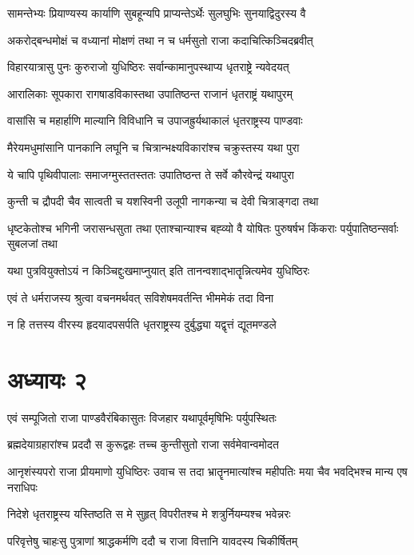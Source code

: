 \twolineshloka
{सामन्तेभ्यः प्रियाण्यस्य कार्याणि सुबहून्यपि}
{प्राप्यन्तेऽर्थेः सुलघुभिः सुनयाद्विदुरस्य वै}


\twolineshloka
{अकरोद्बन्धमोक्षं च वध्यानां मोक्षणं तथा}
{न च धर्मसुतो राजा कदाचित्किञ्चिदब्रवीत्}


\twolineshloka
{विहारयात्रासु पुनः कुरुराजो युधिष्ठिरः}
{सर्वान्कामानुपस्थाप्य धृतराष्ट्रे न्यवेदयत्}


\twolineshloka
{आरालिकाः सूपकारा रागषाडविकास्तथा}
{उपातिष्ठन्त राजानं धृतराष्ट्रं यथापुरम्}


\twolineshloka
{वासांसि च महार्हाणि माल्यानि विविधानि च}
{उपाजह्रुर्यथाकालं धृतराष्ट्रस्य पाण्डवाः}


\twolineshloka
{मैरेयमधुमांसानि पानकानि लघूनि च}
{चित्रान्भक्ष्यविकारांश्च चक्रुस्तस्य यथा पुरा}


\twolineshloka
{ये चापि पृथिवीपालाः समाजग्मुस्ततस्ततः}
{उपातिष्ठन्त ते सर्वे कौरवेन्द्रं यथापुरा}


\twolineshloka
{कुन्ती च द्रौपदी चैव सात्वती च यशस्विनी}
{उलूपी नागकन्या च देवी चित्राङ्गदा तथा}


\threelineshloka
{धृष्टकेतोश्च भगिनी जरासन्धसुता तथा}
{एताश्चान्याश्च बह्व्यो वै योषितः पुरुषर्षभ}
{किंकराः पर्युपातिष्ठन्सर्वाः सुबलजां तथा}


\twolineshloka
{यथा पुत्रवियुक्तोऽयं न किञ्चिद्दुःखमाप्नुयात्}
{इति तानन्वशाद्भातॄन्नित्यमेव युधिष्ठिरः}


\twolineshloka
{एवं ते धर्मराजस्य श्रुत्वा वचनमर्थवत्}
{सविशेषमवर्तन्ति भीममेकं तदा विना}


\twolineshloka
{न हि तत्तस्य वीरस्य हृदयादपसर्पति}
{धृतराष्ट्रस्य दुर्बुद्ध्या यद्वृत्तं द्यूतमण्डले}


\chapter{अध्यायः २}
\twolineshloka
{एवं सम्पूजितो राजा पाण्डवैरंबिकासुतः}
{विजहार यथापूर्वमृषिभिः पर्युपस्थितः}


\twolineshloka
{ब्रह्मदेयाग्रहारांश्च प्रददौ स कुरूद्वहः}
{तच्च कुन्तीसुतो राजा सर्वमेवान्वमोदत}


\threelineshloka
{आनृशंस्यपरो राजा प्रीयमाणो युधिष्ठिरः}
{उवाच स तदा भ्रातॄनमात्यांश्च महीपतिः}
{मया चैव भवद्भिश्च मान्य एष नराधिपः}


\twolineshloka
{निदेशे धृतराष्ट्रस्य यस्तिष्ठति स मे सुहृत्}
{विपरीतश्च मे शत्रुर्नियम्यश्च भवेन्नरः}


\twolineshloka
{परिवृत्तेषु चाहःसु पुत्राणां श्राद्धकर्मणि}
{ददौ च राजा वित्तानि यावदस्य चिकीर्षितम्}


